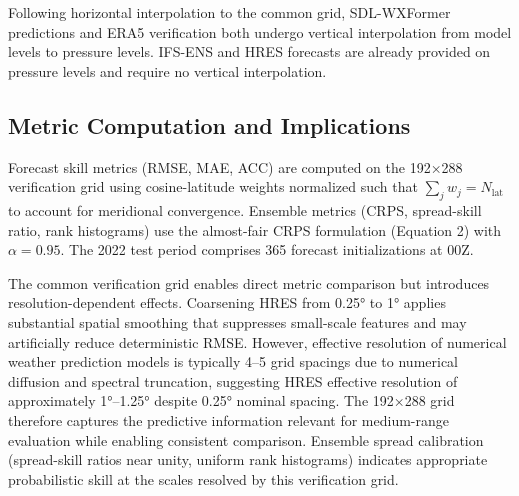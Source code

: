 \documentclass{agujournal2019}
\begin{document}
Following horizontal interpolation to the common grid, SDL-WXFormer predictions and ERA5 verification both undergo vertical interpolation from model levels to pressure levels. IFS-ENS and HRES forecasts are already provided on pressure levels and require no vertical interpolation.

\subsection{Metric Computation and Implications}

Forecast skill metrics (RMSE, MAE, ACC) are computed on the 192×288 verification grid using cosine-latitude weights normalized such that $\sum_{j} w_j = N_{\text{lat}}$ to account for meridional convergence. Ensemble metrics (CRPS, spread-skill ratio, rank histograms) use the almost-fair CRPS formulation (Equation 2) with $\alpha = 0.95$. The 2022 test period comprises 365 forecast initializations at 00Z.

The common verification grid enables direct metric comparison but introduces resolution-dependent effects. Coarsening HRES from 0.25° to 1° applies substantial spatial smoothing that suppresses small-scale features and may artificially reduce deterministic RMSE. However, effective resolution of numerical weather prediction models is typically 4–5 grid spacings due to numerical diffusion and spectral truncation, suggesting HRES effective resolution of approximately 1°–1.25° despite 0.25° nominal spacing. The 192×288 grid therefore captures the predictive information relevant for medium-range evaluation while enabling consistent comparison. Ensemble spread calibration (spread-skill ratios near unity, uniform rank histograms) indicates appropriate probabilistic skill at the scales resolved by this verification grid.



\end{document}
